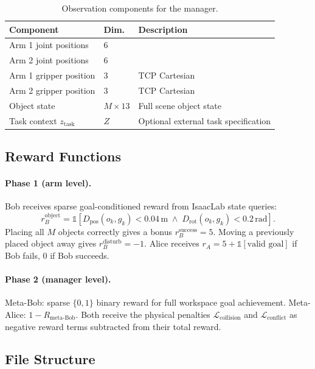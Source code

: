 \documentclass[12pt, a4paper]{article}
\newcommand{\calL}{\mathcal{L}}
\begin{document}
\begin{table}[h!]
\centering
\caption{Observation components for the manager.}
\begin{tabularx}{\textwidth}{llX}
\toprule
Component & Dim. & Description \\
\midrule
Arm 1 joint positions & 6 & \\
Arm 2 joint positions & 6 & \\
Arm 1 gripper position & 3 & TCP Cartesian \\
Arm 2 gripper position & 3 & TCP Cartesian \\
Object state & $M \times 13$ & Full scene object state \\
Task context $z_{\mathrm{task}}$ & $Z$ & Optional external task specification \\
\bottomrule
\end{tabularx}
\label{tab:obs_manager}
\end{table}

\subsection{Reward Functions}
\label{subsec:rewards}

\paragraph{Phase 1 (arm level).}
Bob receives sparse goal-conditioned reward from IsaacLab state queries:
\begin{equation}
    r_B^{\text{object}} = \mathbb{1}[D_{\mathrm{pos}}(o_k, g_k) < 0.04\,\mathrm{m}
    \;\wedge\; D_{\mathrm{rot}}(o_k, g_k) < 0.2\,\mathrm{rad}].
\end{equation}
Placing all $M$ objects correctly gives a bonus $r_B^{\text{success}} = 5$.
Moving a previously placed object away gives $r_B^{\text{disturb}} = -1$.
Alice receives $r_A = 5 + \mathbb{1}[\text{valid goal}]$ if Bob fails, 0 if Bob succeeds.

\paragraph{Phase 2 (manager level).}
Meta-Bob: sparse $\{0, 1\}$ binary reward for full workspace goal achievement.
Meta-Alice: $1 - R_{\text{meta-Bob}}$.
Both receive the physical penalties $\calL_{\mathrm{collision}}$ and
$\calL_{\mathrm{conflict}}$ as negative reward terms subtracted from their total reward.

\subsection{File Structure}
\label{subsec:files}
\end{document}

